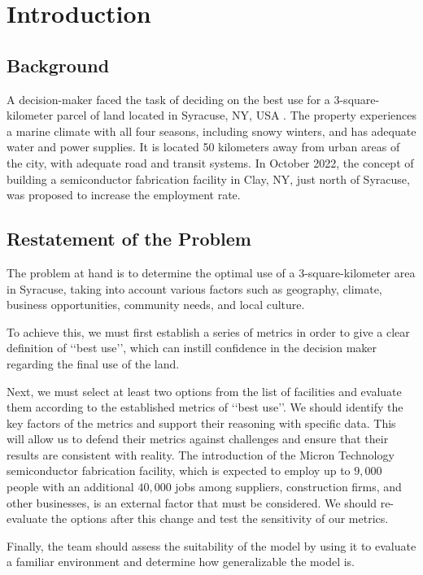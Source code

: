 \documentclass[./main.tex]{subfiles}
\begin{document}
    \section{Introduction}
    \subsection{Background}
    A decision-maker faced the task of deciding on the best use for a 3-square-kilometer parcel of land
    located in Syracuse, NY, USA .
    The property experiences a marine climate with all four seasons, including snowy winters, and has adequate water and power supplies.
    It is located 50 kilometers away from urban areas of the city, with adequate road and transit systems.
    In October 2022, the concept of building a semiconductor fabrication facility in Clay, NY, just north of Syracuse, was proposed to increase the employment rate.


    \subsection{Restatement of the Problem}
    The problem at hand is to determine the optimal use of a 3-square-kilometer area in Syracuse, taking into account various factors such as geography, climate, business opportunities, community needs, and local culture.

    To achieve this, we must first establish a series of metrics in order to give a  clear definition of \lq\lq{best use}\rq\rq, which can instill
    confidence in
    the decision maker regarding the final use of the land.

    Next, we must select at least two options from the list of facilities and evaluate them according to the
    established metrics of \lq\lq{best use}\rq\rq.
    We should identify the key factors of the metrics and support
    their
    reasoning with specific data.
    This will allow us to defend their metrics against challenges and ensure that their results are consistent with reality.
    The introduction of the Micron Technology semiconductor fabrication facility, which is expected to employ up to $9,000$ people with an additional $40,000$
    jobs among suppliers, construction firms, and other businesses, is an external factor that must be considered.
    We should re-evaluate the options after this change and test the sensitivity of our metrics.

    Finally, the team should assess the suitability of the model by using it to evaluate a familiar environment and
    determine how generalizable the model is.
\end{document}
